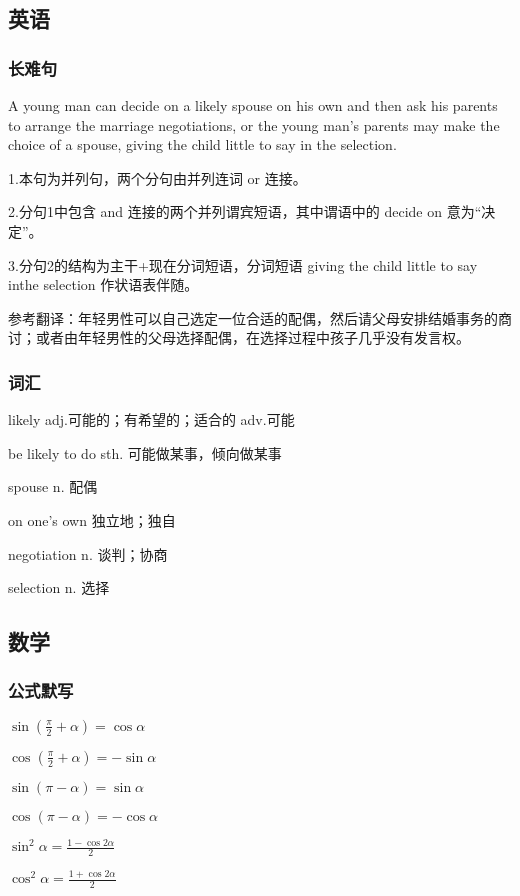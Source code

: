 \documentclass[UTF8]{ctexart}
\begin{document}
\subsection{英语}
\subsubsection{长难句}
A young man can decide on a likely spouse on his own and then ask his parents to arrange the marriage negotiations, or the young man's parents may make the choice of a spouse, giving the child little to say in the selection.

1.本句为并列句，两个分句由并列连词 or 连接。

2.分句1中包含 and 连接的两个并列谓宾短语，其中谓语中的 decide on 意为“决定”。

3.分句2的结构为主干+现在分词短语，分词短语 giving the child little to say inthe selection 作状语表伴随。

参考翻译：年轻男性可以自己选定一位合适的配偶，然后请父母安排结婚事务的商讨；或者由年轻男性的父母选择配偶，在选择过程中孩子几乎没有发言权。
\subsubsection{词汇}
likely adj.可能的；有希望的；适合的 adv.可能

be likely to do sth. 可能做某事，倾向做某事

spouse n. 配偶

on one's own 独立地；独自

negotiation n. 谈判；协商

selection n. 选择
\subsection{数学}
\subsubsection{公式默写}
\begin{multicols}{3}
    $\sin\left ( \frac{\pi}{2} + \alpha  \right ) =\cos \alpha$

    $\cos\left ( \frac{\pi}{2}+\alpha\right )=-\sin \alpha$

    $\sin \left ( \pi - \alpha\right )=\sin \alpha$

    $\cos \left ( \pi - \alpha\right )=-\cos \alpha$

    $\sin^2\alpha=\frac{1-\cos 2\alpha}{2}$

    $\cos^2\alpha=\frac{1+\cos 2\alpha}{2}$
\end{multicols}
\end{document}
